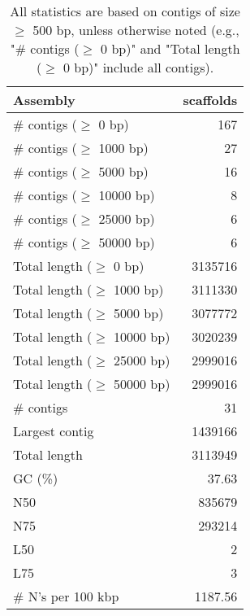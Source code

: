 \documentclass[12pt,a4paper]{article}
\begin{document}
\begin{table}[ht]
\begin{center}
\caption{All statistics are based on contigs of size $\geq$ 500 bp, unless otherwise noted (e.g., "\# contigs ($\geq$ 0 bp)" and "Total length ($\geq$ 0 bp)" include all contigs).}
\begin{tabular}{|l*{1}{|r}|}
\hline
Assembly & scaffolds \\ \hline
\# contigs ($\geq$ 0 bp) & 167 \\ \hline
\# contigs ($\geq$ 1000 bp) & 27 \\ \hline
\# contigs ($\geq$ 5000 bp) & 16 \\ \hline
\# contigs ($\geq$ 10000 bp) & 8 \\ \hline
\# contigs ($\geq$ 25000 bp) & 6 \\ \hline
\# contigs ($\geq$ 50000 bp) & 6 \\ \hline
Total length ($\geq$ 0 bp) & 3135716 \\ \hline
Total length ($\geq$ 1000 bp) & 3111330 \\ \hline
Total length ($\geq$ 5000 bp) & 3077772 \\ \hline
Total length ($\geq$ 10000 bp) & 3020239 \\ \hline
Total length ($\geq$ 25000 bp) & 2999016 \\ \hline
Total length ($\geq$ 50000 bp) & 2999016 \\ \hline
\# contigs & 31 \\ \hline
Largest contig & 1439166 \\ \hline
Total length & 3113949 \\ \hline
GC (\%) & 37.63 \\ \hline
N50 & 835679 \\ \hline
N75 & 293214 \\ \hline
L50 & 2 \\ \hline
L75 & 3 \\ \hline
\# N's per 100 kbp & 1187.56 \\ \hline
\end{tabular}
\end{center}
\end{table}
\end{document}
